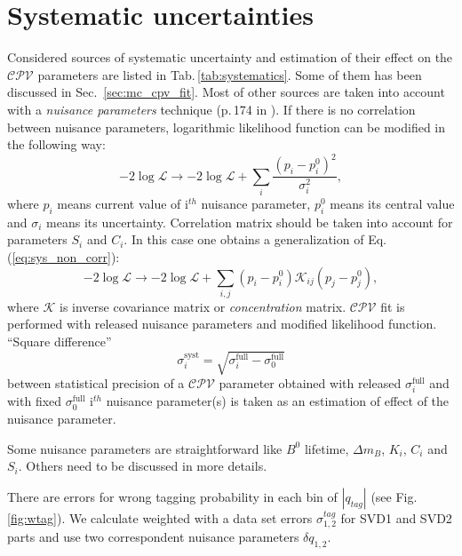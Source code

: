 \documentclass[preprint,aps,showpacs]{revtex4}
\newcommand{\cpvconj}{\ensuremath{\mathcal{CPV}}\xspace}
\begin{document}
\section{Systematic uncertainties}
Considered sources of systematic uncertainty and estimation of their effect on the \cpvconj parameters are listed in Tab.\,\ref{tab:systematics}. Some of them has been discussed in Sec.~\ref{sec:mc_cpv_fit}. Most of other sources are taken into account with a {\it nuisance parameters} technique (p.\,174 in \cite{statistics}). If there is no correlation between nuisance parameters, logarithmic likelihood function can be modified in the following way:
\begin{equation}\label{eq:sys_non_corr}
 -2\log{\mathcal{L}}\to -2\log{\mathcal{L}}+\sum\limits_i\frac{\left(p_i-p_i^{0}\right)^2}{\sigma^2_{i}},
\end{equation}
where $p_i$ means current value of i$^{th}$ nuisance parameter, $p_i^0$ means its central value and $\sigma_i$ means its uncertainty. Correlation matrix should be taken into account for parameters $S_i$ and $C_i$. In this case one obtains a generalization of Eq.\,(\ref{eq:sys_non_corr}):
\begin{equation}\label{eq:sys_with_corr}
 -2\log{\mathcal{L}}\to -2\log{\mathcal{L}}+\sum\limits_{i,j}\left(p_i-p_i^{0}\right)\mathcal{K}_{ij}\left(p_j-p_j^{0}\right),
 \end{equation}
where $\mathcal{K}$ is inverse covariance matrix or {\it concentration} matrix. \cpvconj fit is performed with released nuisance parameters and modified likelihood function. ``Square difference''
\begin{equation}
 \sigma^{\text{syst}}_{i}=\sqrt{\sigma^{\text{full}}_{i}-\sigma^{\text{full}}_{0}}
\end{equation}
between statistical precision of a \cpvconj parameter obtained with released $\sigma^{\text{full}}_{i}$ and with fixed $\sigma^{\text{full}}_{0}$ i$^{th}$ nuisance parameter(s) is taken as an estimation of effect of the nuisance parameter.

Some nuisance parameters are straightforward like $B^0$ lifetime, $\Delta m_B$, $K_i$, $C_i$ and $S_i$. Others need to be discussed in more details.

There are errors for wrong tagging probability in each bin of $|q_{tag}|$ (see Fig.\,\ref{fig:wtag}). We calculate weighted with a data set errors $\sigma_{1,2}^{tag}$ for SVD1 and SVD2 parts and use two correspondent nuisance parameters $\delta q_{1,2}$.
\end{document}

